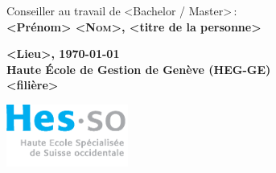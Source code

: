 \begin{titlepage}
\begin{center}
			\vspace{1cm}
      \vfill

			Conseiller au travail de <Bachelor / Master>\,:\\
				\textbf{\Large{} <Prénom> \textsc{<Nom>}, <titre de la personne>}\\

			\vspace{2cm}
			\vfill		

			\textbf{\large <Lieu>, \today{}}\\
				\textbf{\large Haute École de Gestion de Genève (HEG-GE)}\\
				\textbf{\large <filière>}\\

		\end{center}

 		\vfill
		
			\begin{flushright}
		 		\includegraphics[width=4cm]{images/hes-logo.eps}
			\end{flushright}
  
	\end{titlepage}
\makeatother

\styleCenter		%
